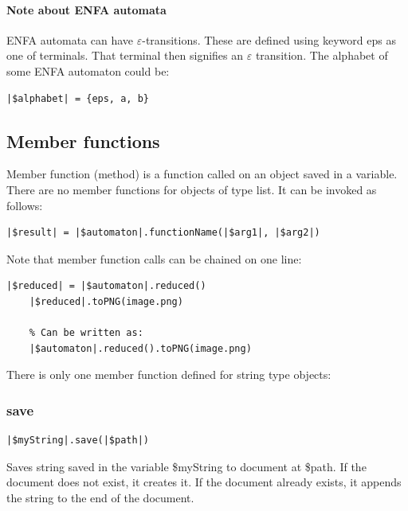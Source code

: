 \documentclass{ctuthesis}
\begin{document}
\paragraph{Note about ENFA automata}
ENFA automata can have $\varepsilon$-transitions. These are defined using keyword eps as one of terminals. That terminal then signifies an $\varepsilon$ transition. The alphabet of some ENFA automaton could be:
\begin{lstlisting}[language = JASL]
	|$alphabet| = {eps, a, b}
\end{lstlisting} 

\subsection{Member functions}
\label{subsec:member-functions}
Member function (method) is a function called on an object saved in a variable. There are no member functions for objects of type list. It can be invoked as follows:

\begin{minipage}{\linewidth}
\begin{lstlisting}[language = JASL_snippet]
	|$result| = |$automaton|.functionName(|$arg1|, |$arg2|)	
\end{lstlisting}
\end{minipage} 

Note that member function calls can be chained on one line:

\begin{minipage}{\linewidth}
\begin{lstlisting}[language = JASL]
	|$reduced| = |$automaton|.reduced()
	|$reduced|.toPNG(image.png)
	
	% Can be written as:
	|$automaton|.reduced().toPNG(image.png)
\end{lstlisting}
\end{minipage}

There is only one member function defined for string type objects:
\subsubsection{save}
\begin{lstlisting}[language = JASL_snippet]
	|$myString|.save(|$path|)
\end{lstlisting}

Saves string saved in the variable \$myString to document at \$path. If the document does not exist, it creates it. If the document already exists, it appends the string to the end of the document.
\end{document}
